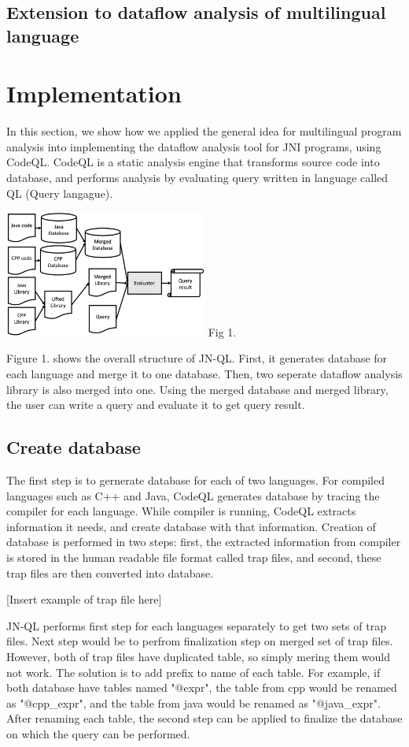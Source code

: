 \subsection{Extension to dataflow analysis of multilingual language}

\section{Implementation}
In this section, we show how we applied the general idea for multilingual
program analysis into implementing the dataflow analysis tool for JNI programs,
using CodeQL. CodeQL is a static analysis engine that transforms source code
into database, and performs analysis by evaluating query written in language
called QL (Query langague).

\includegraphics[width=0.5\textwidth]{img/Fig1}
Fig 1.

Figure 1. shows the overall structure of JN-QL. First, it generates database
for each language and merge it to one database. Then, two seperate dataflow
analysis library is also merged into one. Using the merged database and
merged library, the user can write a query and evaluate it to get query
result.

\subsection{Create database}
The first step is to gernerate database for each of two languages.  For
compiled languages such as C++ and Java, CodeQL generates database by tracing
the compiler for each language. While compiler is running, CodeQL extracts
information it needs, and create database with that information.  Creation of
database is performed in two steps: first, the extracted information from
compiler is stored in the human readable file format called trap files, and
second, these trap files are then converted into database.

[Insert example of trap file here]

JN-QL performs first step for each languages separately to get two sets of trap
files.  Next step would be to perfrom finalization step on merged set of trap
files. However, both of trap files have duplicated table, so simply mering them
would not work. The solution is to add prefix to name of each table. For
example, if both database have tables named "@expr", the table from cpp would
be renamed as "@cpp\_expr", and the table from java would be renamed as
"@java\_expr". After renaming each table, the second step can be applied to
finalize the database on which the query can be performed.

